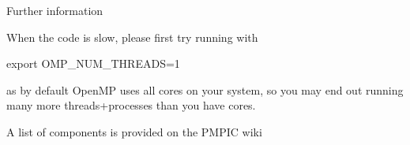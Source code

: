 \documentclass{beamer}
\newenvironment{Shaded}{}{}
\newcommand{\VariableTok}[1]{\textcolor[rgb]{0.00,0.00,0.00}{{#1}}}
\newcommand{\BuiltInTok}[1]{{#1}}
\newcommand{\NormalTok}[1]{{#1}}
\begin{document}
\begin{frame}[fragile]{Further information}
\protect\hypertarget{further information}{}

When the code is slow, please first try running with

\begin{Shaded}
\begin{Highlighting}[]
\BuiltInTok{export} \VariableTok{OMP_NUM_THREADS=}\NormalTok{1}
\end{Highlighting}
\end{Shaded}

as by default OpenMP uses all cores on your system, so you may end out
running many more threads+processes than you have cores.

A list of components is provided on the PMPIC wiki

\end{frame}
\end{document}
